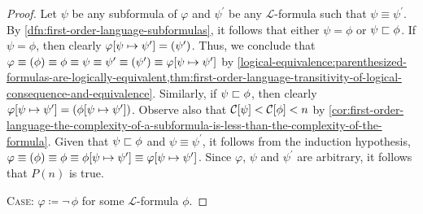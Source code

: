 \begin{proof}
    \vspace{0.1cm}
    \noindent
    Let \( \psi \) be any subformula of \( \varphi \) and \( \psi^{\prime} \) be any \( \mathcal{L} \)-formula such that \( \psi \equiv \psi^{\prime} \).
    By \cref{dfn:first-order-language-subformulas}, it follows that either \( \psi = \phi \) or \( \psi  \sqsubset  \phi \).
    If \( \psi = \phi \), then clearly \( \folsubformulasubstitution{\varphi}{\psi}{\psi^{\prime}} = \mleft( \psi^{\prime} \mright) \).
    Thus, we conclude that \( \varphi \equiv \mleft( \phi \mright) \equiv \phi \equiv \psi \equiv \psi^{\prime} \equiv \mleft( \psi^{\prime} \mright)
    \equiv \folsubformulasubstitution{\varphi}{\psi}{\psi^{\prime}} \)
    by \cref{logical-equivalence:parenthesized-formulas-are-logically-equivalent,thm:first-order-language-transitivity-of-logical-consequence-and-equivalence}.
    Similarly, if \( \psi  \sqsubset  \phi \), then clearly
    \( \folsubformulasubstitution{\varphi}{\psi}{\psi^{\prime}} = \mleft( \folsubformulasubstitution{\phi}{\psi}{\psi^{\prime}} \mright) \).
    Observe also that \( \folcomplexityofformula{\psi} < \folcomplexityofformula{\phi} < n \) by
    \cref{cor:first-order-language-the-complexity-of-a-subformula-is-less-than-the-complexity-of-the-formula}.
    Given that \( \psi  \sqsubset  \phi \) and \( \psi \equiv \psi^{\prime} \), it follows from the induction hypothesis,
    \( \varphi \equiv \mleft( \phi \mright) \equiv \phi \equiv \folsubformulasubstitution{\phi}{\psi}{\psi^{\prime}} \equiv
    \folsubformulasubstitution{\varphi}{\psi}{\psi^{\prime}} \).
    Since \( \varphi \), \( \psi \) and \( \psi^{\prime} \) are arbitrary, it follows that \( P(n) \) is true.

    \vspace{0.3cm}
    \noindent
    {\scshape Case}: \( \varphi \coloneq \lnot \, \phi \) for some \( \mathcal{L} \)-formula \( \phi \).
    

\end{proof}
